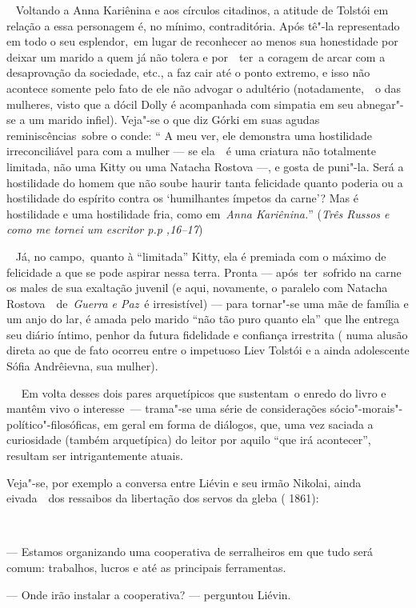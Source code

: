 ~ Voltando a Anna Kariênina e aos círculos citadinos, a atitude de
Tolstói em relação a essa personagem é, no mínimo, contraditória. Após
tê"-la representado em todo o seu esplendor,~em lugar de reconhecer ao
menos sua honestidade por deixar um marido a quem já não tolera e
por~~ter~a coragem de arcar com a desaprovação da sociedade, etc., a faz
cair até o ponto extremo, e isso não acontece somente pelo fato de ele
não advogar o adultério (notadamente,~~o das mulheres, visto que a dócil
Dolly é acompanhada com simpatia em seu abnegar"-se a um marido infiel).
Veja"-se o que diz Górki em suas agudas reminiscências~sobre o conde: ``
A meu ver, ele demonstra uma hostilidade irreconciliável para com a
mulher --- se ela~~é uma criatura não totalmente limitada, não uma Kitty
ou uma Natacha Rostova ---, e gosta de puni"-la. Será a hostilidade do
homem que não soube haurir tanta felicidade quanto poderia ou a
hostilidade do espírito contra os `humilhantes ímpetos da carne'? Mas é
hostilidade e uma hostilidade fria, como em~\emph{Anna Kariênina.}''
(\emph{Três Russos e como me tornei um escritor p.p ,16--17})

\emph{~} Já, no campo,~quanto à ``limitada'' Kitty, ela é premiada com o
máximo de felicidade a que se pode aspirar nessa terra. Pronta ---
após~ter~sofrido na carne os males de sua exaltação juvenil (e aqui,
novamente, o paralelo com Natacha Rostova~~de~\emph{Guerra e Paz}~é
irresistível) --- para tornar"-se uma mãe de família e um anjo do lar, é
amada pelo marido ``não tão puro quanto ela'' que lhe entrega seu diário
íntimo, penhor da futura fidelidade e confiança irrestrita ( numa alusão
direta ao que de fato ocorreu entre o impetuoso Liev Tolstói e a ainda
adolescente Sófia Andrêievna, sua mulher).

~~ Em volta desses dois pares arquetípicos que sustentam~o enredo do
livro e mantêm vivo o interesse~--- trama"-se uma série de considerações
sócio"-morais"-político"-filosóficas, em geral em forma de diálogos, que,
uma vez saciada a curiosidade (também arquetípica) do leitor por aquilo
``que irá acontecer'', resultam ser intrigantemente atuais.

Veja"-se, por exemplo a conversa entre Liévin e seu irmão Nikolai, ainda
eivada~~dos ressaibos da libertação dos servos da gleba ( 1861):

~

--- Estamos organizando uma cooperativa de serralheiros em que tudo será
comum: trabalhos, lucros e até as principais ferramentas.

--- Onde irão instalar a cooperativa? --- perguntou Liévin.


